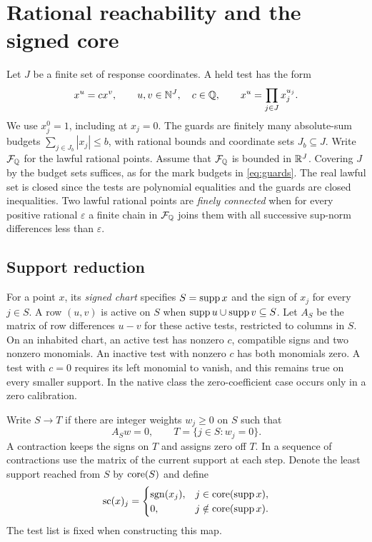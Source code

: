 \section{Rational reachability and the signed core}\label{sec:spectral}

Let \(J\) be a finite set of response coordinates. A held test has the form
\begin{equation}\label{eq:binomial}
 x^{u}=c x^{v},\qquad u,v\in\mathbb{N}^J,\quad c\in\mathbb{Q},
 \qquad x^u=\prod_{j\in J}x_j^{u_j}.
\end{equation}
We use \(x_j^0=1\), including at \(x_j=0\). The guards are finitely many
absolute-sum budgets \(\sum_{j\in J_b}|x_j|\le b\), with rational
bounds and coordinate sets \(J_b\subseteq J\). Write
\(\mathcal F_{\mathbb{Q}}\) for the lawful rational points. Assume that
\(\mathcal F_{\mathbb{Q}}\) is bounded in \(\mathbb{R}^J\). Covering \(J\) by
the budget sets suffices, as for the mark budgets in \eqref{eq:guards}.
The real lawful set is closed since the tests are polynomial equalities
and the guards are closed inequalities.
Two lawful rational points are \emph{finely connected} when for every
positive rational \(\varepsilon\) a finite chain in \(\mathcal F_{\mathbb{Q}}\)
joins them with all successive sup-norm differences less than
\(\varepsilon\).

\subsection{Support reduction}

For a point \(x\), its \emph{signed chart} specifies \(S=\operatorname{supp} x\) and the
sign of \(x_j\) for every \(j\in S\). A row \((u,v)\) is active on \(S\)
when \(\operatorname{supp} u\cup\operatorname{supp} v\subseteq S\).
Let \(A_S\) be the matrix of row differences \(u-v\) for these active tests,
restricted to columns in \(S\).
On an inhabited chart, an active test has nonzero \(c\), compatible signs
and two nonzero monomials. An inactive test with nonzero \(c\) has
both monomials zero. A test with \(c=0\) requires its left monomial to vanish,
and this remains true on every smaller support. In the native class the
zero-coefficient case occurs only in a zero calibration.

\begin{definition}\label{def:signed-core}
Write \(S\to T\) if there are integer weights \(w_j\geq0\) on \(S\) such that
\[
  A_Sw=0,\qquad T=\{j\in S:w_j=0\}.
\]
A contraction keeps the signs on \(T\) and assigns zero off \(T\).
In a sequence of contractions use the matrix of the current support at
each step. Denote the least support reached from \(S\) by \(\operatorname{core}(S)\)
and define
\[
 \operatorname{sc}(x)_j=
 \begin{cases}
   \operatorname{sgn}(x_j), & j\in\operatorname{core}(\operatorname{supp} x),\\
   0, & j\notin\operatorname{core}(\operatorname{supp} x).
 \end{cases}
\]
The test list is fixed when constructing this map.
\end{definition}

